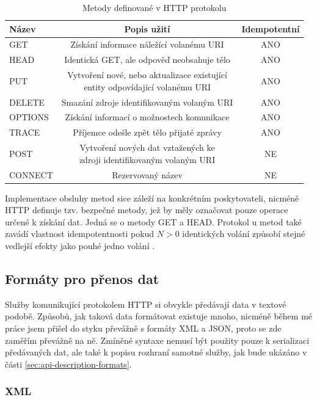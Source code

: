 \documentclass[czech,DP]{thesiskiv}
\begin{document}
\begin{table}[h]
	\centering
	\begin{tabular}{|l|c|c|}
		\hline
		Název & Popis užití & Idempotentní \\
		\hline
		\hline
		GET & Získání informace náležící volanému URI & ANO \\
		\hline
		HEAD & Identická GET, ale odpověď neobsahuje tělo & ANO \\
		\hline
		PUT & \makecell{Vytvoření nové, nebo aktualizace existující \\ entity odpovídající volanému URI }  & ANO \\
		\hline
		DELETE & Smazání zdroje identifikovaným volaným URI & ANO \\
		\hline
		OPTIONS & Získání informací o možnostech komunikace  & ANO \\
		\hline
		TRACE & Příjemce odešle zpět tělo přijaté zprávy & ANO \\
		\hline
		POST & \makecell{Vytvoření nových dat vztažených ke \\ zdroji identifikovaným volaným URI} & NE \\
		\hline
		CONNECT & Rezervovaný název & NE \\
		\hline		
	\end{tabular}
	\caption{Metody definované v HTTP protokolu}
	\label{tab:http-methods}
\end{table}

Implementace obsluhy metod sice záleží na konkrétním poskytovateli, nicméně HTTP definuje tzv. bezpečné metody, jež by měly označovat pouze operace určené k získání dat. Jedná se o metody GET a HEAD. Protokol u metod také zavádí vlastnost idempotentnosti pokud $N>0$ identických volání způsobí stejné vedlejší efekty jako pouhé jedno volání \cite{httpRfc}.


\subsection{Formáty pro přenos dat}

Služby komunikující protokolem HTTP si obvykle předávají data v textové podobě. Způsobů, jak taková data formátovat existuje mnoho, nicméně během mé práce jsem přišel do styku převážně s formáty XML a JSON, proto se zde zaměřím převážně na ně. Zmíněné syntaxe nemusí být použity pouze k serializaci předávaných dat, ale také k popisu rozhraní samotné služby, jak bude ukázáno v části \ref{sec:api-description-formats}.

\subsubsection{XML}
\end{document}
